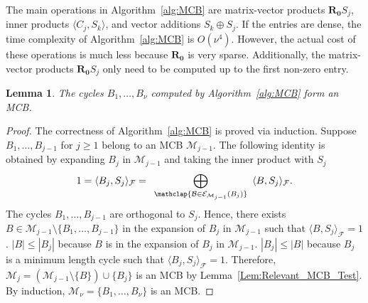 \documentclass[fleqn,11pt]{article}
\newtheorem{lemma}[theorem]{Lemma}
\newcommand\calB{\mathcal{B}}
\newcommand\calF{\mathcal{F}}
\newcommand\calM{\mathcal{M}}
\newcommand\expandd[2]{\mathcal{E}_{#1}(#2)}             %
\begin{document}
The main operations in Algorithm~\ref{alg:MCB} are matrix-vector products $\bm{R_0}S_j$, inner products $\langle C_j,S_k\rangle$, and vector additions $S_k\oplus S_j$.
If the entries are dense, the time complexity of Algorithm~\ref{alg:MCB} is $O(\nu^4)$. However, the actual cost of these operations is much less because $\bm{R_0}$ is very sparse. Additionally, the matrix-vector products $\bm{R_0} S_j$ only need to be computed up to the first non-zero entry.

\begin{lemma}
	The cycles $B_1,\hdots,B_\nu$ computed by Algorithm~\ref{alg:MCB} form an MCB.
\end{lemma}

\begin{proof}
	The correctness of Algorithm~\ref{alg:MCB} is proved via induction. Suppose $B_1,\hdots,B_{j-1}$ for $j\ge 1$ belong to an MCB $\calM_{j-1}$. The following identity is obtained by expanding $B_j$ in $\calM_{j-1}$ and taking the inner product with $S_j$
	\begin{equation}
		1 = \langle B_j,S_j\rangle_\calF = \enspace\bigoplus_{\mathclap{\calB\in\expandd{\calM_{j-1}}{B_j}}}\enspace \langle B,S_j\rangle_\calF.
	\end{equation}
	The cycles $B_1,\hdots,B_{j-1}$ are orthogonal to $S_j$. Hence, there exists $B\in\calM_{j-1}\setminus\{B_1,\hdots,B_{j-1}\}$ in the expansion of $B_j$ in $\calM_{j-1}$ such that $\langle B,S_j\rangle_\calF=1$. $|B|\le |B_j|$ because $B$ is in the expansion of $B_j$ in $\calM_{j-1}$. $|B_j|\le|B|$ because $B_j$ is a minimum length cycle such that $\langle B_j,S_j\rangle_\calF=1$. Therefore, $\calM_j=(\calM_{j-1}\setminus\{B\})\cup\{B_j\}$ is an MCB by Lemma~\ref{Lem:Relevant_MCB_Test}. By induction, $\calM_\nu=\{B_1,\hdots,B_\nu\}$ is an MCB.
\end{proof}




\end{document}
